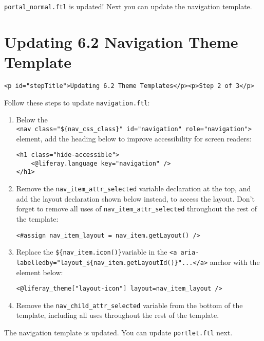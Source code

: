 \texttt{portal\_normal.ftl} is updated! Next you can update the
navigation template.

\chapter{Updating 6.2 Navigation Theme
Template}\label{updating-6.2-navigation-theme-template}

\begin{verbatim}
<p id="stepTitle">Updating 6.2 Theme Templates</p><p>Step 2 of 3</p>
\end{verbatim}

Follow these steps to update \texttt{navigation.ftl}:

\begin{enumerate}
\def\labelenumi{\arabic{enumi}.}
\item
  Below the
  \texttt{\textless{}nav\ class="\$\{nav\_css\_class\}"\ id="navigation"\ role="navigation"\textgreater{}}
  element, add the heading below to improve accessibility for screen
  readers:

\begin{verbatim}
<h1 class="hide-accessible">
    <@liferay.language key="navigation" />
</h1>
\end{verbatim}
\item
  Remove the \texttt{nav\_item\_attr\_selected} variable declaration at
  the top, and add the layout declaration shown below instead, to access
  the layout. Don't forget to remove all uses of
  \texttt{nav\_item\_attr\_selected} throughout the rest of the
  template:

\begin{verbatim}
<#assign nav_item_layout = nav_item.getLayout() />
\end{verbatim}
\item
  Replace the \texttt{\$\{nav\_item.icon()\}}variable in the
  \texttt{\textless{}a\ aria-labelledby="layout\_\$\{nav\_item.getLayoutId()\}"...\textless{}/a\textgreater{}}
  anchor with the element below:

\begin{verbatim}
<@liferay_theme["layout-icon"] layout=nav_item_layout />
\end{verbatim}
\item
  Remove the \texttt{nav\_child\_attr\_selected} variable from the
  bottom of the template, including all uses throughout the rest of the
  template.
\end{enumerate}

The navigation template is updated. You can update \texttt{portlet.ftl}
next.

